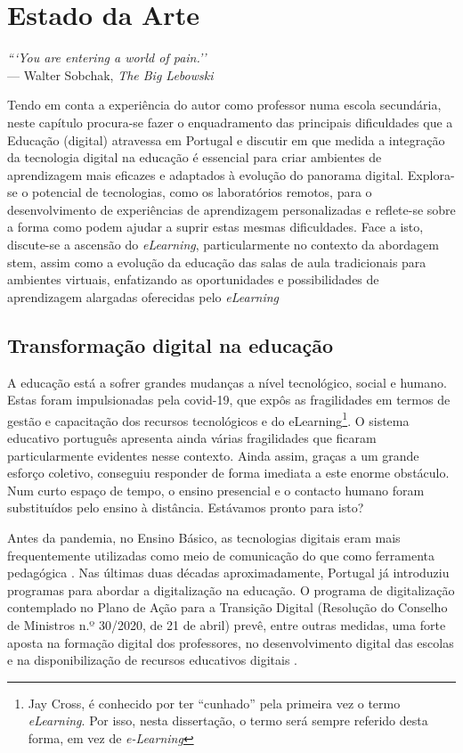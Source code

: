 \chapter{Estado da Arte}
\label{Capitulo2}

\begin{flushright}
\textit{```You are entering a world of pain.''} \\[0.5em]
--- Walter Sobchak, \textit{The Big Lebowski}
\end{flushright}
Tendo em conta a experiência do autor como professor numa escola secundária, neste capítulo procura-se fazer o enquadramento das principais dificuldades que a Educação (digital) atravessa em Portugal e discutir em que medida a integração da tecnologia digital na educação é essencial para criar ambientes de aprendizagem mais eficazes e adaptados à evolução do panorama digital. Explora-se o potencial de tecnologias, como os laboratórios remotos, para o desenvolvimento de experiências de aprendizagem personalizadas e reflete-se sobre a forma como podem ajudar a suprir estas mesmas dificuldades.
Face a isto, discute-se a ascensão do \textit{eLearning}, particularmente no contexto da abordagem \acrshort{stem}, assim como a evolução da educação das salas de aula tradicionais para ambientes virtuais, enfatizando as oportunidades e possibilidades de aprendizagem alargadas oferecidas pelo \textit{eLearning}

\section{Transformação digital na educação}
\label{sec:transformaçãodigital}
A educação está a sofrer grandes mudanças a nível tecnológico, social e humano. Estas foram impulsionadas pela \acrfull{covid-19}, que expôs as fragilidades em termos de gestão e capacitação dos recursos tecnológicos e do eLearning\footnote{Jay Cross, é conhecido por ter ``cunhado'' pela primeira vez o termo \textit{eLearning}\cite{jaycross}. Por isso, nesta dissertação, o termo será sempre referido desta forma, em vez de \textit{e-Learning}}. O sistema educativo português apresenta ainda várias fragilidades que ficaram particularmente evidentes nesse contexto. Ainda assim, graças a um grande esforço coletivo, conseguiu responder de forma imediata a este enorme obstáculo. Num curto espaço de tempo, o ensino presencial e o contacto humano foram substituídos pelo ensino à distância. Estávamos pronto para isto?

Antes da pandemia, no Ensino Básico, as tecnologias digitais eram mais frequentemente utilizadas como meio de comunicação do que como ferramenta pedagógica \cite{oecd_using_2021}. Nas últimas duas décadas aproximadamente, Portugal já introduziu programas para abordar a digitalização na educação. O programa de digitalização contemplado no Plano de Ação para a Transição Digital (Resolução do Conselho de Ministros n.º 30/2020, de 21 de abril) prevê, entre outras medidas, uma forte aposta na formação digital dos professores, no desenvolvimento digital das escolas e na disponibilização de recursos educativos digitais \cite{transicaodigital, capacitacaodigital}.


